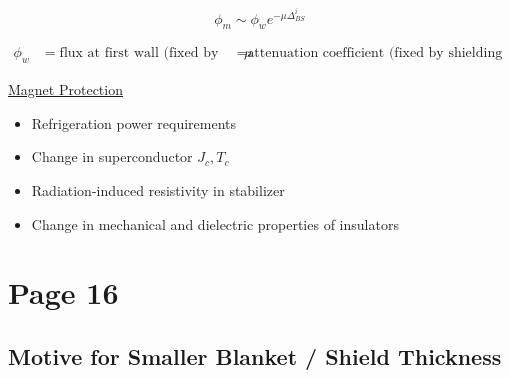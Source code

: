 \documentclass[11pt]{report} %
\begin{document}
\begin{equation}
\phi_m \sim \phi_w e^{-\mu \Delta_{BS}^i}
\end{equation}


\begin{align}
\phi_w & = \text{flux at first wall (fixed by design)}
\mu & = \text{attenuation coefficient (fixed by shielding composition)}
\end{align}

\underline{Magnet Protection}
\begin{itemize}
\item Refrigeration power requirements
\item Change in superconductor $J_c,T_c$
\item Radiation-induced resistivity in stabilizer
\item Change in mechanical and dielectric properties of insulators
\end{itemize}

\section{Page 16}
\subsection{Motive for Smaller Blanket / Shield Thickness}
\end{document}
